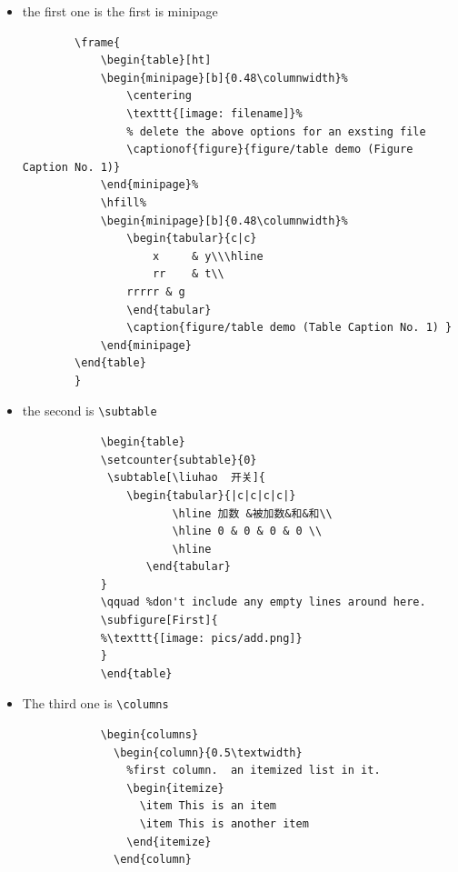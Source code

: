 \documentclass[a4paper,12pt,twoside]{book}
\begin{document}
\begin{CJK*}{UTF8}{song}
\begin{itemize}
	\item the first one is the first is minipage
		\begin{verbatim}
		\frame{
			\begin{table}[ht]
			\begin{minipage}[b]{0.48\columnwidth}%
		    	\centering
		    	\texttt{[image: filename]}%
		    	% delete the above options for an exsting file
		    	\captionof{figure}{figure/table demo (Figure Caption No. 1)}
			\end{minipage}%
			\hfill%
			\begin{minipage}[b]{0.48\columnwidth}%
				\begin{tabular}{c|c}
					x     & y\\\hline
					rr    & t\\
				rrrrr & g
				\end{tabular}
				\caption{figure/table demo (Table Caption No. 1) }
			\end{minipage}
		\end{table}
		}
		\end{verbatim}

	\item the second is \verb=\subtable=
		\begin{verbatim}
			\begin{table}
			\setcounter{subtable}{0}
			 \subtable[\liuhao  开关]{
			    \begin{tabular}{|c|c|c|c|}
			           \hline 加数 &被加数&和&和\\
			           \hline 0 & 0 & 0 & 0 \\
			           \hline
			       \end{tabular}
			}
			\qquad %don't include any empty lines around here.
			\subfigure[First]{
			%\texttt{[image: pics/add.png]}
			}
			\end{table}
		\end{verbatim}

	\item The third one is  \verb=\columns=
		\begin{verbatim}
			\begin{columns}
			  \begin{column}{0.5\textwidth}
			    %first column.  an itemized list in it.
			    \begin{itemize}
			      \item This is an item
			      \item This is another item
			    \end{itemize}
			  \end{column}


\end{verbatim}
\end{itemize}
\end{CJK*}
\end{document}

